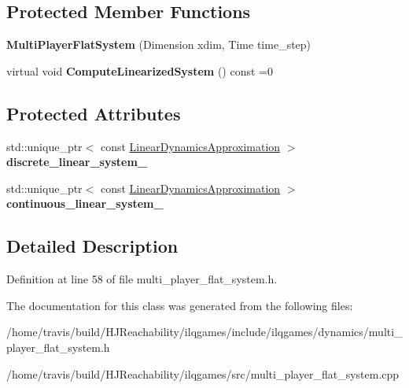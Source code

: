 \subsection*{Protected Member Functions}
\begin{DoxyCompactItemize}
\item 
{\bfseries Multi\+Player\+Flat\+System} (Dimension xdim, Time time\+\_\+step)\hypertarget{classilqgames_1_1_multi_player_flat_system_a73df802233de8b218744e662ab250b59}{}\label{classilqgames_1_1_multi_player_flat_system_a73df802233de8b218744e662ab250b59}

\item 
virtual void {\bfseries Compute\+Linearized\+System} () const =0\hypertarget{classilqgames_1_1_multi_player_flat_system_ab5e1b8bb3cf07f07c04d7f3884c1c015}{}\label{classilqgames_1_1_multi_player_flat_system_ab5e1b8bb3cf07f07c04d7f3884c1c015}

\end{DoxyCompactItemize}
\subsection*{Protected Attributes}
\begin{DoxyCompactItemize}
\item 
std\+::unique\+\_\+ptr$<$ const \hyperlink{structilqgames_1_1_linear_dynamics_approximation}{Linear\+Dynamics\+Approximation} $>$ {\bfseries discrete\+\_\+linear\+\_\+system\+\_\+}\hypertarget{classilqgames_1_1_multi_player_flat_system_a70c6bbb2e4cd3653594fd650fbcdad94}{}\label{classilqgames_1_1_multi_player_flat_system_a70c6bbb2e4cd3653594fd650fbcdad94}

\item 
std\+::unique\+\_\+ptr$<$ const \hyperlink{structilqgames_1_1_linear_dynamics_approximation}{Linear\+Dynamics\+Approximation} $>$ {\bfseries continuous\+\_\+linear\+\_\+system\+\_\+}\hypertarget{classilqgames_1_1_multi_player_flat_system_ab4961edf0a14f8645c79d2ad39ebd7d6}{}\label{classilqgames_1_1_multi_player_flat_system_ab4961edf0a14f8645c79d2ad39ebd7d6}

\end{DoxyCompactItemize}


\subsection{Detailed Description}


Definition at line 58 of file multi\+\_\+player\+\_\+flat\+\_\+system.\+h.



The documentation for this class was generated from the following files\+:\begin{DoxyCompactItemize}
\item 
/home/travis/build/\+H\+J\+Reachability/ilqgames/include/ilqgames/dynamics/multi\+\_\+player\+\_\+flat\+\_\+system.\+h\item 
/home/travis/build/\+H\+J\+Reachability/ilqgames/src/multi\+\_\+player\+\_\+flat\+\_\+system.\+cpp\end{DoxyCompactItemize}
